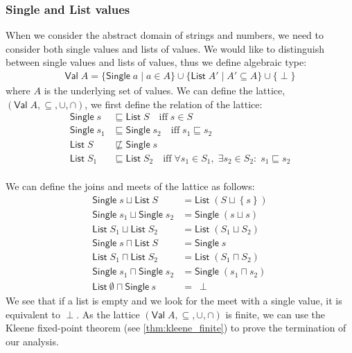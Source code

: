 \subsubsection{Single and List values}
When we consider the abstract domain of strings and numbers, we need to consider both single values and lists of values.
We would like to distinguish between single values and lists of values, thus we define algebraic type:
\begin{align}
    \mathsf{Val} \; A = \{ \mathsf{Single} \; a \mid a \in A \} \cup \{ \mathsf{List} \; A' \mid A' \subseteq A \} \cup \{ \perp \}
\end{align}
where $A$ is the underlying set of values.
We can define the lattice, $(\mathsf{Val} \; A, \subseteq, \cup, \cap)$, we first define the relation of the lattice:
\begin{align}
    \mathsf{Single} \; s &\sqsubseteq \mathsf{List} \; S \quad
    \text{iff} \; s \in S \\
    \mathsf{Single} \; s_1 &\sqsubseteq \mathsf{Single} \; s_2 \quad
    \text{iff} \; s_1 \sqsubseteq s_2 \\
    \mathsf{List} \; S &\not\sqsubseteq \mathsf{Single} \; s\\
    \mathsf{List} \; S_1 &\sqsubseteq \mathsf{List} \; S_2 \quad
    \text{iff} \; \forall s_1 \in S_1, \; \exists s_2 \in S_2: \; s_1 \sqsubseteq s_2\\
\end{align}

We can define the joins and meets of the lattice as follows:
\begin{align}
    \mathsf{Single} \; s \sqcup \mathsf{List} \; S &= \mathsf{List} \; (S\sqcup\left\{ s \right\})\\
    \mathsf{Single} \; s_1 \sqcup \mathsf{Single} \; s_2 &= \mathsf{Single} \; (s \sqcup s )\\
    \mathsf{List} \; S_1 \sqcup \mathsf{List} \; S_2 &= \mathsf{List} \; (S_1 \sqcup S_2)\\
    \mathsf{Single} \; s \sqcap \mathsf{List} \; S &= \mathsf{Single} \; s\\
    \mathsf{List} \; S_1 \sqcap \mathsf{List} \; S_2 &= \mathsf{List} \; (S_1 \sqcap S_2)\\
    \mathsf{Single} \; s_1 \sqcap \mathsf{Single} \; s_2 &= \mathsf{Single} \; (s_1 \sqcap s_2)\\
    \mathsf{List} \ \emptyset \sqcap \mathsf{Single} \ s &= \ \perp
\end{align}
We see that if a list is empty and we look for the meet with a single value, it is equivalent to $\perp$.
As the lattice $(\mathsf{Val} \; A, \subseteq, \cup, \cap)$ is finite, we can use the Kleene fixed-point theorem (see \autoref{thm:kleene_finite}) to prove the termination of our analysis.


